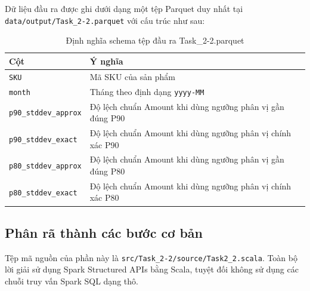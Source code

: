 Dữ liệu đầu ra được ghi dưới dạng một tệp Parquet duy nhất tại \texttt{data/output/Task\_2-2.parquet} với cấu trúc như sau:
\begin{table}[H]
\centering
\begin{tabular}{ll}
\toprule
\textbf{Cột} & \textbf{Ý nghĩa} \\
\midrule
\texttt{SKU} & Mã SKU của sản phẩm \\
\texttt{month} & Tháng theo định dạng \texttt{yyyy-MM} \\
\texttt{p90\_stddev\_approx} & Độ lệch chuẩn Amount khi dùng ngưỡng phân vị gần đúng P90 \\
\texttt{p90\_stddev\_exact} & Độ lệch chuẩn Amount khi dùng ngưỡng phân vị chính xác P90 \\
\texttt{p80\_stddev\_approx} & Độ lệch chuẩn Amount khi dùng ngưỡng phân vị gần đúng P80 \\
\texttt{p80\_stddev\_exact} & Độ lệch chuẩn Amount khi dùng ngưỡng phân vị chính xác P80 \\
\bottomrule
\end{tabular}
\caption{Định nghĩa schema tệp đầu ra Task\_2-2.parquet}
\label{tab:task2_2_schema}
\end{table}

\subsection{Phân rã thành các bước cơ bản}
Tệp mã nguồn của phần này là \texttt{src/Task\_2-2/source/Task2\_2.scala}. Toàn bộ lời giải sử dụng Spark Structured APIs bằng Scala, tuyệt đối không sử dụng các chuỗi truy vấn Spark SQL dạng thô.

